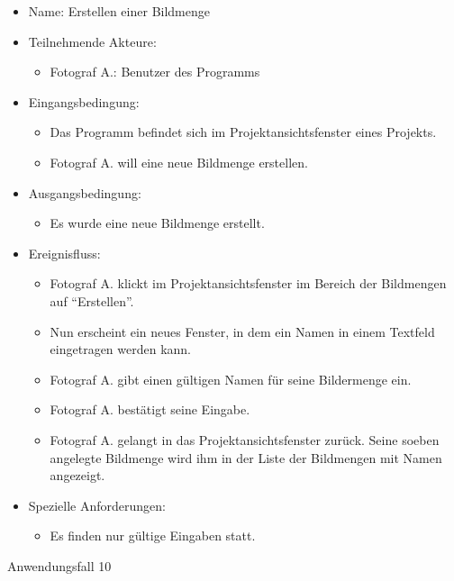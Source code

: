 \begin{itemize}
	\begin{itemize}
		\item Name: Erstellen einer Bildmenge
		\item Teilnehmende Akteure:
		\begin{itemize}
			\item	Fotograf A.: Benutzer des Programms		
		\end{itemize}
		\item Eingangsbedingung:
		\begin{itemize}
			\item	Das Programm befindet sich im Projektansichtsfenster eines Projekts.
			\item Fotograf A. will eine neue Bildmenge erstellen.
		\end{itemize}
		\item Ausgangsbedingung:
		\begin{itemize}
			\item	Es wurde eine neue Bildmenge erstellt.	
		\end{itemize}
		\item Ereignisfluss:
		\begin{itemize}
			\item Fotograf A. klickt im Projektansichtsfenster im Bereich der Bildmengen auf "`Erstellen"'.		
			\item Nun erscheint ein neues Fenster, in dem ein Namen in einem Textfeld eingetragen werden kann.
			\item Fotograf A. gibt einen gültigen Namen für seine Bildermenge ein.
			\item Fotograf A. bestätigt seine Eingabe.
			\item Fotograf A. gelangt in das Projektansichtsfenster zurück. Seine soeben angelegte Bildmenge wird ihm in der Liste der Bildmengen mit Namen angezeigt.
		\end{itemize}
		\item Spezielle Anforderungen:
		\begin{itemize}
			\item	Es finden nur gültige Eingaben statt.		
		\end{itemize}			
	\end{itemize}
	
	\begin{description}
		\item[Anwendungsfall 10]
	\end{description}
	

\end{itemize}
